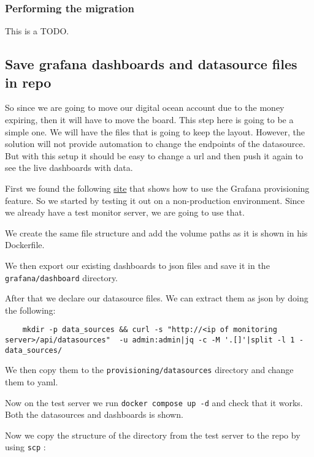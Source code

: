 \subsubsection{Performing the migration}
\label{log:performing-the-migration}

This is a TODO.

\subsection{Save grafana dashboards and datasource files in repo}
\label{log:save-grafana-dashboards-and-datasource-files-in-repo}

So since we are going to move our digital ocean account due to the money expiring, then it will have to move the board. This step here is going to be a simple one. We will have the files that is going to keep the layout. However, the solution will not provide automation to change the endpoints of the datasource. But with this setup it should be easy to change a url and then push it again to see the live dashboards with data.

First we found the following \href{https://github.com/SebastianTorralba/Self-Provisioned-Grafana}{site} that shows how to use the Grafana provisioning feature. So we started by testing it out on a non-production environment. Since we already have a test monitor server, we are going to use that.

We create the same file structure and add the volume paths as it is shown in his Dockerfile.

We then export our existing dashboards to json files and save it in the \texttt{grafana/dashboard} directory.

After that we declare our datasource files. We can extract them as json by doing the following:

\begin{verbatim}
    mkdir -p data_sources && curl -s "http://<ip of monitoring server>/api/datasources"  -u admin:admin|jq -c -M '.[]'|split -l 1 - data_sources/
\end{verbatim}

We then copy them to the \texttt{provisioning/datasources} directory and change them to yaml.

Now on the test server we run \texttt{docker\ compose\ up\ -d} and check that it works. Both the datasources and dashboards is shown.

Now we copy the structure of the directory from the test server to the repo by using \texttt{scp} :

